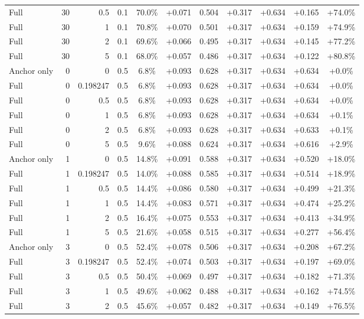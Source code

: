 \begin{table}[htbp]
\begin{tabular}{lrrrccccccc}
Full & 30 & 0.5 & 0.1 & 70.0\% & +0.071 & 0.504 & +0.317 & +0.634 & +0.165 & +74.0\% \\
Full & 30 & 1 & 0.1 & 70.8\% & +0.070 & 0.501 & +0.317 & +0.634 & +0.159 & +74.9\% \\
Full & 30 & 2 & 0.1 & 69.6\% & +0.066 & 0.495 & +0.317 & +0.634 & +0.145 & +77.2\% \\
Full & 30 & 5 & 0.1 & 68.0\% & +0.057 & 0.486 & +0.317 & +0.634 & +0.122 & +80.8\% \\
Anchor only & 0 & 0 & 0.5 & 6.8\% & +0.093 & 0.628 & +0.317 & +0.634 & +0.634 & +0.0\% \\
Full & 0 & 0.198247 & 0.5 & 6.8\% & +0.093 & 0.628 & +0.317 & +0.634 & +0.634 & +0.0\% \\
Full & 0 & 0.5 & 0.5 & 6.8\% & +0.093 & 0.628 & +0.317 & +0.634 & +0.634 & +0.0\% \\
Full & 0 & 1 & 0.5 & 6.8\% & +0.093 & 0.628 & +0.317 & +0.634 & +0.634 & +0.1\% \\
Full & 0 & 2 & 0.5 & 6.8\% & +0.093 & 0.628 & +0.317 & +0.634 & +0.633 & +0.1\% \\
Full & 0 & 5 & 0.5 & 9.6\% & +0.088 & 0.624 & +0.317 & +0.634 & +0.616 & +2.9\% \\
Anchor only & 1 & 0 & 0.5 & 14.8\% & +0.091 & 0.588 & +0.317 & +0.634 & +0.520 & +18.0\% \\
Full & 1 & 0.198247 & 0.5 & 14.0\% & +0.088 & 0.585 & +0.317 & +0.634 & +0.514 & +18.9\% \\
Full & 1 & 0.5 & 0.5 & 14.4\% & +0.086 & 0.580 & +0.317 & +0.634 & +0.499 & +21.3\% \\
Full & 1 & 1 & 0.5 & 14.4\% & +0.083 & 0.571 & +0.317 & +0.634 & +0.474 & +25.2\% \\
Full & 1 & 2 & 0.5 & 16.4\% & +0.075 & 0.553 & +0.317 & +0.634 & +0.413 & +34.9\% \\
Full & 1 & 5 & 0.5 & 21.6\% & +0.058 & 0.515 & +0.317 & +0.634 & +0.277 & +56.4\% \\
Anchor only & 3 & 0 & 0.5 & 52.4\% & +0.078 & 0.506 & +0.317 & +0.634 & +0.208 & +67.2\% \\
Full & 3 & 0.198247 & 0.5 & 52.4\% & +0.074 & 0.503 & +0.317 & +0.634 & +0.197 & +69.0\% \\
Full & 3 & 0.5 & 0.5 & 50.4\% & +0.069 & 0.497 & +0.317 & +0.634 & +0.182 & +71.3\% \\
Full & 3 & 1 & 0.5 & 49.6\% & +0.062 & 0.488 & +0.317 & +0.634 & +0.162 & +74.5\% \\
Full & 3 & 2 & 0.5 & 45.6\% & +0.057 & 0.482 & +0.317 & +0.634 & +0.149 & +76.5\% \\

\end{tabular}
\end{table}
